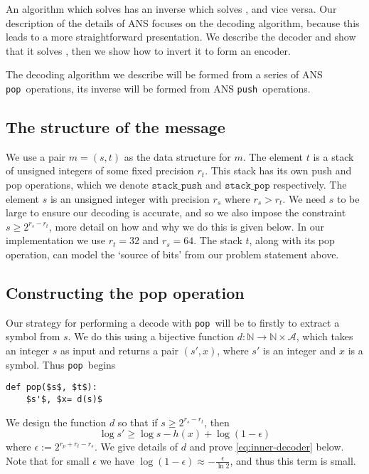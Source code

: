 \documentclass{article}
\theoremstyle{definition}
\newcommand{\push}{\texttt{push}}
\newcommand{\pop}{\texttt{pop}}
\begin{document}
An algorithm which solves  has an inverse which solves
, and vice versa. Our description of the details of ANS
focuses on the decoding algorithm, because this leads to a more straightforward
presentation. We describe the decoder and show that it solves ,
then we show how to invert it to form an encoder.

The decoding algorithm we describe will be formed from a series of ANS \pop\
operations, its inverse will be formed from ANS \push\ operations.

\subsection{The structure of the message}\label{sec:message}
We use a pair \(m = (s, t)\) as the data structure for \(m\). The element \(t\)
is a stack of unsigned integers of some fixed precision \(r_t\). This stack has
its own push and pop operations, which we denote \(\texttt{stack\_push}\) and
\(\texttt{stack\_pop}\) respectively. The element \(s\) is an unsigned integer
with precision \(r_s\) where \(r_s > r_t\). We need \(s\) to be large to ensure
our decoding is accurate, and so we also impose the constraint \(s\geq2^{r_s -
r_t}\), more detail on how and why we do this is given below. In our
implementation we use \(r_t = 32\) and \(r_s = 64\). The stack \(t\), along
with its pop operation, can model the `source of bits' from our problem
statement above.

\subsection{Constructing the pop operation}
Our strategy for performing a decode with \pop\ will be to firstly to extract a
symbol from \(s\). We do this using a bijective function \(d:\mathbb
N\rightarrow\mathbb N\times\mathcal{A}\), which takes an integer \(s\) as input
and returns a pair \((s', x)\), where \(s'\) is an integer and \(x\) is a
symbol.  Thus \pop\ begins
\begin{lstlisting}
def pop($s$, $t$):
    $s'$, $x= d(s)$
\end{lstlisting}
We design the function \(d\) so that if \(s\geq 2^{r_s - r_t}\), then
\begin{equation}\label{eq:inner-decoder}
  \log s'\geq\log s - h(x) + \log (1 - \epsilon)
\end{equation}
where \(\epsilon := 2^{r_p + r_t - r_s}\). We give details of \(d\) and prove
\cref{eq:inner-decoder} below. Note that for small \(\epsilon\) we have \(\log
(1 - \epsilon) \approx -\frac{\epsilon}{\ln2}\), and thus this term is small.
\end{document}
